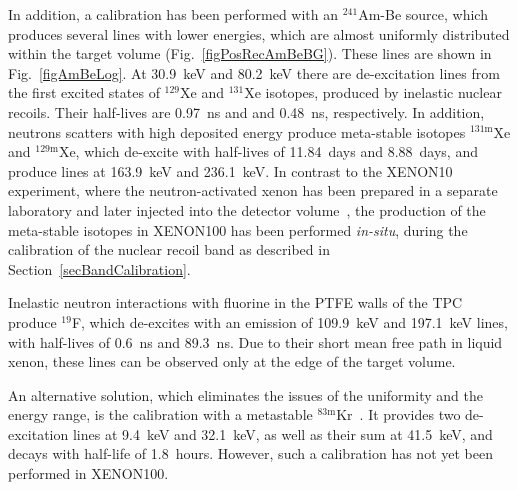 In addition, a calibration has been performed with an $^{241}$Am-Be source, which produces  several lines with lower energies, which are almost uniformly distributed within the target volume (Fig.~\ref{figPosRecAmBeBG}). These lines are shown in Fig.~\ref{figAmBeLog}. At 30.9~keV and 80.2~keV there are de-excitation lines from the first excited states of $^{129}$Xe and $^{131}$Xe isotopes, produced by inelastic nuclear recoils. Their half-lives are 0.97~ns and and 0.48~ns, respectively. In addition, neutrons scatters with high deposited energy produce meta-stable isotopes $^{131\mathrm{m}}$Xe and $^{129\mathrm{m}}$Xe, which de-excite with half-lives of 11.84~days and 8.88~days, and produce lines at 163.9~keV and 236.1~keV. 
In contrast to the XENON10 experiment, where the neutron-activated xenon has been prepared in a separate laboratory and later injected into the detector volume~\cite{NeutronActivationXe10}, the production of the meta-stable isotopes in XENON100 has been performed {\it in-situ}, during the calibration of the nuclear recoil band as described in Section~\ref{secBandCalibration}. 

Inelastic neutron interactions with fluorine in the PTFE walls of the TPC produce $^{19}$F, which de-excites with an emission of 109.9~keV and 197.1~keV lines, with half-lives of  0.6~ns and 89.3~ns. Due to their short mean free path in liquid xenon, these lines can be observed only at the edge of the target volume.

An alternative solution, which eliminates the issues of the uniformity and the energy range, is the calibration with a metastable $^{83\mathrm{m}}$Kr~\cite{Kr83_Yale, Kr83_UZH}. It provides two de-excitation lines at 9.4~keV and 32.1~keV, as well as their sum at 41.5~keV, and decays with half-life of 1.8~hours. However, such a calibration has not yet been performed in XENON100.

